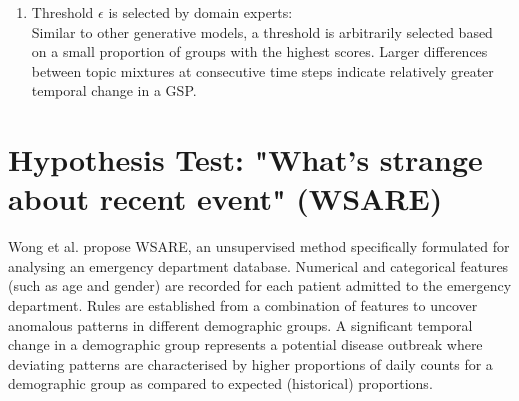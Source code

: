 \begin{enumerate}[4.]
\item   Threshold $\epsilon $ is  selected by domain experts: \\  
Similar to other generative models, a threshold is arbitrarily selected based on a small proportion of groups with the highest scores.   
 Larger differences between topic mixtures at consecutive time steps indicate relatively  greater temporal change in a GSP.   
\end{enumerate} 




\section{Hypothesis Test: "What's strange about recent event" (WSARE)}
 Wong et al. \cite{WSARE} propose  WSARE, an  unsupervised method specifically  formulated for analysing an emergency department database.    
Numerical and categorical features (such as age and gender) are recorded for each patient admitted to the emergency department. Rules are established from a combination of features to uncover anomalous patterns in different demographic groups.  A significant temporal change in a demographic  group represents a potential disease outbreak where deviating patterns are characterised by higher proportions of daily counts for a demographic group as compared to expected (historical) proportions.  %


